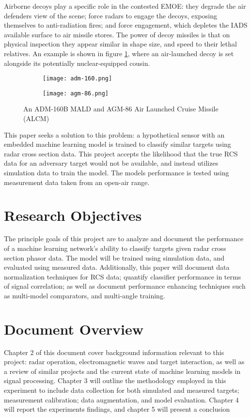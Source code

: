 Airborne decoys play a specific role in the contested EMOE:  they degrade the air defenders view of the scene; force radars to engage the decoys, exposing themselves to anti-radiation fires; and force engagement, which depletes the IADS available surface to air missile stores. The power of decoy missiles is that on physical inspection they appear similar in shape size, and speed to their lethal relatives. An example is shown in figure \ref{fig:missiles}, where an air-launched decoy is set alongside its potentially nuclear-equipped cousin.

\begin{figure}[htbp]
  \centering
  \begin{subfigure}{.5\textwidth}
    \centering
    \texttt{[image: adm-160.png]}
  \end{subfigure}%
  \begin{subfigure}{.5\textwidth}
    \centering
    \texttt{[image: agm-86.png]}
  \end{subfigure}
  \caption[Air Launched Platform Comparison]{An ADM-160B MALD and AGM-86 Air Launched Cruise Missile (ALCM)}
  \label{fig:missiles}
\end{figure}


This paper seeks a solution to this problem:  a hypothetical sensor with an embedded machine learning model is trained to classify similar targets using radar cross section data. This project accepts the likelihood that the true RCS data for an adversary target would not be available, and instead utilizes simulation data to train the model. The models performance is tested using measurement data taken from an open-air range.


\section{Research Objectives}
\label{sec:objectives}

The principle goals of this project are to analyze and document the performance of a machine learning network's ability to classify targets given radar cross section phasor data. The model will be trained using simulation data, and evaluated using measured data. Additionally, this paper will document data normalization techniques for RCS data; quantify classifier performance in terms of signal correlation; as well as document performance enhancing techniques such as multi-model comparators, and multi-angle training.

\section{Document Overview}
\label{sec:overview}

Chapter 2 of this document cover background information relevant to this project: radar operation, electromagnetic waves and target interaction, as well as a review of similar projects and the current state of machine learning models in signal processing. Chapter 3 will outline the methodology employed in this experiment to include data collection for both simulated and measured targets; measurement calibration; data augmentation, and model evaluation. Chapter 4 will report the experiments findings, and chapter 5 will present a conclusion
